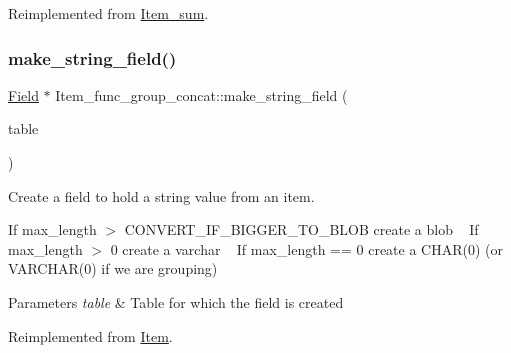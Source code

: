 Reimplemented from \mbox{\hyperlink{classItem__sum_ab44941149d918895e5f58ae94d3cd909}{Item\+\_\+sum}}.

\mbox{\label{classItem__func__group__concat_ae472eb4f6eb3190f8baa326054acf9f8}} 
\subsubsection{\texorpdfstring{make\+\_\+string\+\_\+field()}{make\_string\_field()}}
{\footnotesize\ttfamily \mbox{\hyperlink{classField}{Field}} $\ast$ Item\+\_\+func\+\_\+group\+\_\+concat\+::make\+\_\+string\+\_\+field (\begin{DoxyParamCaption}\item[{\mbox{\hyperlink{structTABLE}{T\+A\+B\+LE}} $\ast$}]{table }\end{DoxyParamCaption})\hspace{0.3cm}{\ttfamily [virtual]}}

Create a field to hold a string value from an item.

If max\+\_\+length $>$ C\+O\+N\+V\+E\+R\+T\+\_\+\+I\+F\+\_\+\+B\+I\+G\+G\+E\+R\+\_\+\+T\+O\+\_\+\+B\+L\+OB create a blob ~\newline
If max\+\_\+length $>$ 0 create a varchar ~\newline
If max\+\_\+length == 0 create a C\+H\+A\+R(0) (or V\+A\+R\+C\+H\+A\+R(0) if we are grouping)


\begin{DoxyParams}{Parameters}
{\em table} & Table for which the field is created \\
\hline
\end{DoxyParams}


Reimplemented from \mbox{\hyperlink{classItem_a4380479e68d46a2d719e4a0f5c2ee25e}{Item}}.

\mbox{\label{classItem__func__group__concat_a89dcd722bccaa2c1b16d972ce823087f}} 

